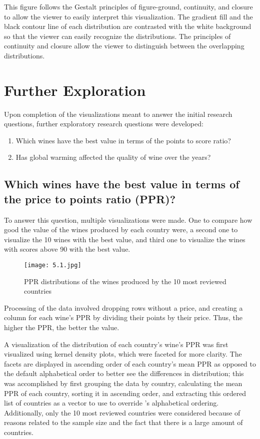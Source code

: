 This figure follows the Gestalt principles of figure-ground, continuity, and closure to allow the viewer to easily interpret this visualization. The gradient fill and the black contour line of each distribution are contrasted with the white background so that the viewer can easily recognize the distributions. The principles of continuity and closure allow the viewer to distinguish between the overlapping distributions.


\section{Further Exploration}

Upon completion of the visualizations meant to answer the initial research questions, further exploratory research questions were developed:

\begin{enumerate}
  \item Which wines have the best value in terms of the points to score ratio? 
  \item Has global warming affected the quality of wine over the years?
\end{enumerate}

\subsection{Which wines have the best value in terms of the price to points ratio (PPR)?}

To answer this question, multiple visualizations were made. One to compare how good the value of the wines produced by each country were, a second one to visualize the 10 wines with the best value, and third one to visualize the wines with scores above 90 with the best value.

\begin{figure}[h]
  \texttt{[image: 5.1.jpg]}
  \caption{PPR distributions of the wines produced by the 10 most reviewed countries} %
\end{figure}

Processing of the data involved dropping rows without a price, and creating a column for each wine's PPR by dividing their points by their price. Thus, the higher the PPR, the better the value.

A visualization of the distribution of each country's wine's PPR was first visualized using kernel density plots, which were faceted for more clarity. The facets are displayed in ascending order of each country's mean PPR as opposed to the default alphabetical order to better see the differences in distribution; this was accomplished by first grouping the data by country, calculating the mean PPR of each country, sorting it in ascending order, and extracting this ordered list of countries as a vector to use to override 's alphabetical ordering. Additionally, only the 10 most reviewed countries were considered because of reasons related to the sample size and the fact that there is a large amount of countries.

